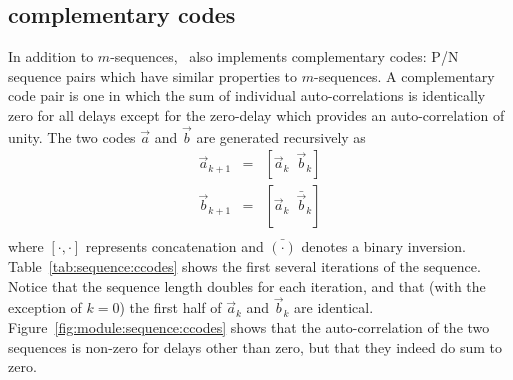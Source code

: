 \subsection{complementary codes}
\label{module:sequence:ccodes}
In addition to $m$-sequences, \liquid\ also implements complementary codes:
P/N sequence pairs which have similar properties to $m$-sequences.
A complementary code pair is one in which the sum of individual
auto-correlations is identically zero for all delays except for the zero-delay
which provides an auto-correlation of unity.
%
The two codes $\vec{a}$ and $\vec{b}$ are generated recursively as
\begin{eqnarray*}
    \vec{a}_{k+1} & = & \left[ \vec{a}_k \,\,\,      \vec{b}_k  \right] \\
    \vec{b}_{k+1} & = & \left[ \vec{a}_k \,\,\, \bar{\vec{b}}_k \right] \\
\end{eqnarray*}
where $[\cdot,\cdot]$ represents concatenation and
$\bar{(\cdot)}$ denotes a binary inversion.
Table~\ref{tab:sequence:ccodes} shows the first several iterations of the
sequence.
Notice that the sequence length doubles for each iteration, and that (with the
exception of $k=0$) the first half of $\vec{a}_k$ and $\vec{b}_k$ are
identical.
Figure~\ref{fig:module:sequence:ccodes} shows that the auto-correlation of the two
sequences is non-zero for delays other than zero, but that they indeed do sum
to zero.

